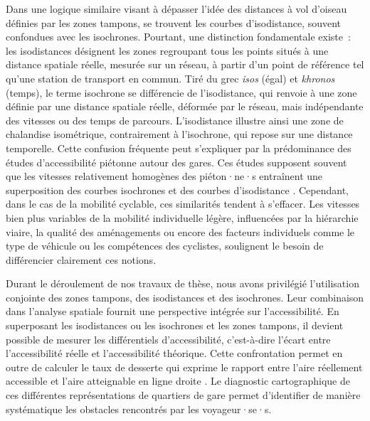 \begin{refsegment}
Dans une logique similaire visant à dépasser l’idée des distances à vol d’oiseau définies par les zones tampons, se trouvent les courbes d’isodistance, souvent confondues avec les isochrones. Pourtant, une distinction fondamentale existe~: les isodistances désignent les zones regroupant tous les points situés à une distance spatiale réelle, mesurée sur un réseau, à partir d’un point de référence tel qu’une station de transport en commun. Tiré du grec \textsl{isos} (égal) et \textsl{khronos} (temps), le terme isochrone se différencie de l’isodistance, qui renvoie à une zone définie par une distance spatiale réelle, déformée par le réseau, mais indépendante des vitesses ou des temps de parcours. L’isodistance illustre ainsi une zone de chalandise isométrique, contrairement à l’isochrone, qui repose sur une distance temporelle. Cette confusion fréquente peut s’expliquer par la prédominance des études d’accessibilité piétonne autour des gares. Ces études supposent souvent que les vitesses relativement homogènes des piéton·ne·s entraînent une superposition des courbes isochrones et des courbes d’isodistance \textcolor{blue}{\autocite[9]{heran_zones_2009}}. Cependant, dans le cas de la mobilité cyclable, ces similarités tendent à s’effacer. Les vitesses bien plus variables de la mobilité individuelle légère, influencées par la hiérarchie viaire, la qualité des aménagements ou encore des facteurs individuels comme le type de véhicule ou les compétences des cyclistes, soulignent le besoin de différencier clairement ces notions.%

Durant le déroulement de nos travaux de thèse, nous avons privilégié l’utilisation conjointe des zones tampons, des isodistances et des isochrones. Leur combinaison dans l’analyse spatiale fournit une perspective intégrée sur l’accessibilité. En superposant les isodistances ou les isochrones et les zones tampons, il devient possible de mesurer les différentiels d’accessibilité, c’est-à-dire l’écart entre l’accessibilité réelle et l’accessibilité théorique. Cette confrontation permet en outre de calculer le taux de desserte qui exprime le rapport entre l’aire réellement accessible et l’aire atteignable en ligne droite \textcolor{blue}{\autocite[13]{heran_zones_2009}}. Le diagnostic cartographique de ces différentes représentations de quartiers de gare permet d’identifier de manière systématique les obstacles rencontrés par les voyageur·se·s.%


\end{refsegment}

